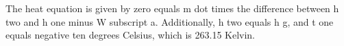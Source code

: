 The heat equation is given by zero equals m dot times the difference between h two and h one minus W subscript a. Additionally, h two equals h g, and t one equals negative ten degrees Celsius, which is 263.15 Kelvin.